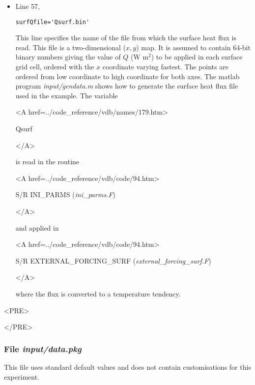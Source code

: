 \begin{itemize}
\item Line 57,
\begin{verbatim}
surfQfile='Qsurf.bin'
\end{verbatim}
This line specifies the name of the file from which the surface heat flux 
is read. This file is a two-dimensional
($x,y$) map. It is assumed to contain 64-bit binary numbers 
giving the value of $Q$ (W m$^2$) to be applied in each surface grid cell, ordered with 
the $x$ coordinate varying fastest. The points are ordered from low coordinate
to high coordinate for both axes. The matlab program
{\it input/gendata.m} shows how to generate the 
surface heat flux file used in the example. 
The variable
{\bf
\begin{rawhtml} <A href=../code_reference/vdb/names/179.htm> \end{rawhtml}
Qsurf 
\begin{rawhtml} </A>\end{rawhtml}
}
is read in the routine
{\it
\begin{rawhtml} <A href=../code_reference/vdb/code/94.htm> \end{rawhtml}
S/R INI\_PARMS ({\it ini\_parms.F})
\begin{rawhtml} </A>\end{rawhtml}
}
and applied in  
{\it
\begin{rawhtml} <A href=../code_reference/vdb/code/94.htm> \end{rawhtml}
S/R EXTERNAL\_FORCING\_SURF ({\it external\_forcing\_surf.F})
\begin{rawhtml} </A>\end{rawhtml}
} where the flux is converted to a temperature tendency.


\end{itemize}


\begin{rawhtml}<PRE>\end{rawhtml}
\begin{small}

\end{small}
\begin{rawhtml}</PRE>\end{rawhtml}


\subsubsection{File {\it input/data.pkg}}

This file uses standard default values and does not contain
customisations for this experiment.

